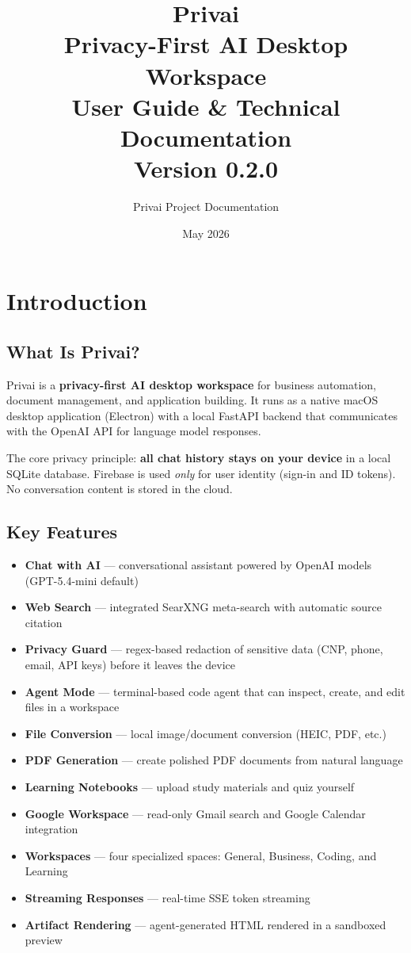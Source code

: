 \documentclass[a4paper,11pt,twoside]{report}
\title{
  \vspace{2cm}
  {\Huge\bfseries\color{privaiblue} Privai}\\[0.5cm]
  {\Large Privacy-First AI Desktop Workspace}\\[1cm]
  {\large User Guide \& Technical Documentation}\\[2cm]
  {\normalsize Version 0.2.0}
}
\author{Privai Project Documentation}
\date{May 2026}
\begin{document}
\maketitle
\tableofcontents

\chapter{Introduction}

\section{What Is Privai?}
Privai is a \textbf{privacy-first AI desktop workspace} for business automation, document management, and application building. It runs as a native macOS desktop application (Electron) with a local FastAPI backend that communicates with the OpenAI API for language model responses.

The core privacy principle: \textbf{all chat history stays on your device} in a local SQLite database. Firebase is used \emph{only} for user identity (sign-in and ID tokens). No conversation content is stored in the cloud.

\section{Key Features}
\begin{itemize}[leftmargin=1.5em]
  \item \textbf{Chat with AI} --- conversational assistant powered by OpenAI models (GPT-5.4-mini default)
  \item \textbf{Web Search} --- integrated SearXNG meta-search with automatic source citation
  \item \textbf{Privacy Guard} --- regex-based redaction of sensitive data (CNP, phone, email, API keys) before it leaves the device
  \item \textbf{Agent Mode} --- terminal-based code agent that can inspect, create, and edit files in a workspace
  \item \textbf{File Conversion} --- local image/document conversion (HEIC, PDF, etc.)
  \item \textbf{PDF Generation} --- create polished PDF documents from natural language
  \item \textbf{Learning Notebooks} --- upload study materials and quiz yourself
  \item \textbf{Google Workspace} --- read-only Gmail search and Google Calendar integration
  \item \textbf{Workspaces} --- four specialized spaces: General, Business, Coding, and Learning
  \item \textbf{Streaming Responses} --- real-time SSE token streaming
  \item \textbf{Artifact Rendering} --- agent-generated HTML rendered in a sandboxed preview
\end{itemize}
\end{document}
